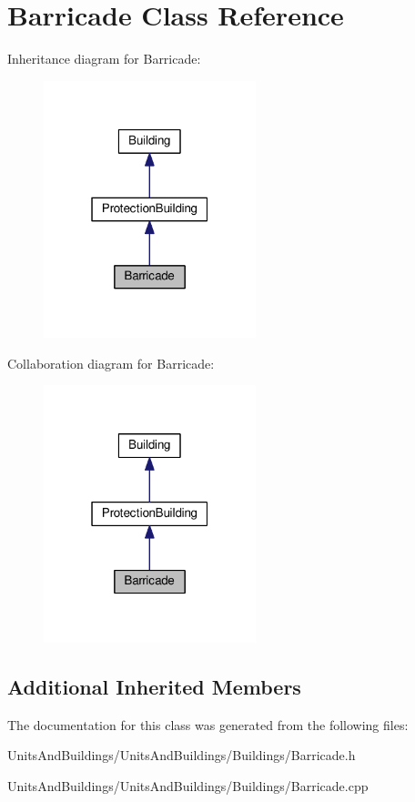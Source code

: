\hypertarget{class_barricade}{}\section{Barricade Class Reference}
\label{class_barricade}


Inheritance diagram for Barricade\+:
\nopagebreak
\begin{figure}[H]
\begin{center}
\leavevmode
\includegraphics[width=175pt]{class_barricade__inherit__graph}
\end{center}
\end{figure}


Collaboration diagram for Barricade\+:
\nopagebreak
\begin{figure}[H]
\begin{center}
\leavevmode
\includegraphics[width=175pt]{class_barricade__coll__graph}
\end{center}
\end{figure}
\subsection*{Additional Inherited Members}


The documentation for this class was generated from the following files\+:\begin{DoxyCompactItemize}
\item 
Units\+And\+Buildings/\+Units\+And\+Buildings/\+Buildings/Barricade.\+h\item 
Units\+And\+Buildings/\+Units\+And\+Buildings/\+Buildings/Barricade.\+cpp\end{DoxyCompactItemize}

